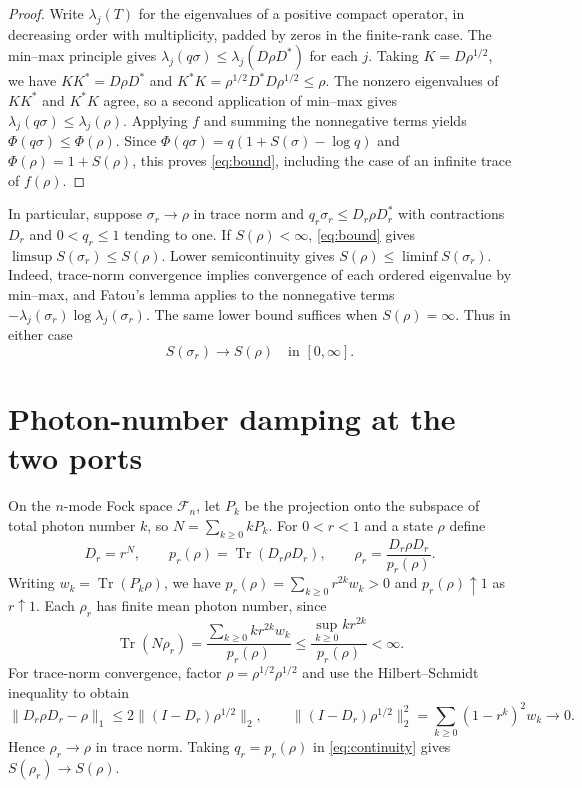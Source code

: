 \documentclass[11pt,letterpaper]{article}
\numberwithin{equation}{section}
\DeclareMathOperator{\Tr}{Tr}
\newcommand{\Fock}{\mathcal F_n}
\begin{document}
\begin{proof}
Write $\lambda_j(T)$ for the eigenvalues of a positive compact
operator, in decreasing order with multiplicity, padded by zeros in
the finite-rank case. The min--max principle gives
$\lambda_j(q\sigma)\le\lambda_j(D\rho D^*)$ for each $j$.
Taking $K=D\rho^{1/2}$, we have $KK^*=D\rho D^*$ and
$K^*K=\rho^{1/2}D^*D\rho^{1/2}\le\rho$. The nonzero eigenvalues of
$KK^*$ and $K^*K$ agree, so a second application of min--max gives
$\lambda_j(q\sigma)\le\lambda_j(\rho)$. Applying $f$ and summing the
nonnegative terms yields $\Phi(q\sigma)\le\Phi(\rho)$. Since
$\Phi(q\sigma)=q(1+S(\sigma)-\log q)$ and $\Phi(\rho)=1+S(\rho)$,
this proves \eqref{eq:bound}, including the case of an infinite trace
of $f(\rho)$.
\end{proof}

In particular, suppose $\sigma_r\to\rho$ in trace norm and
$q_r\sigma_r\le D_r\rho D_r^*$ with contractions $D_r$ and
$0<q_r\le1$ tending to one. If $S(\rho)<\infty$, \eqref{eq:bound} gives
$\limsup S(\sigma_r)\le S(\rho)$. Lower semicontinuity gives
$S(\rho)\le\liminf S(\sigma_r)$. Indeed, trace-norm convergence implies
convergence of each ordered eigenvalue by min--max, and Fatou's
lemma applies to the nonnegative terms
$-\lambda_j(\sigma_r)\log\lambda_j(\sigma_r)$. The same lower
bound suffices when $S(\rho)=\infty$. Thus in either case
\begin{equation}\label{eq:continuity}
 S(\sigma_r)\longrightarrow S(\rho)\quad\text{in }[0,\infty].
\end{equation}

\section{Photon-number damping at the two ports}

On the $n$-mode Fock space $\Fock$, let $P_k$ be the projection
onto the subspace of total photon number $k$, so
$N=\sum_{k\ge0}kP_k$. For $0<r<1$ and a state $\rho$ define
\begin{equation}\label{eq:filter}
 D_r=r^N,\qquad p_r(\rho)=\Tr(D_r\rho D_r),\qquad
 \rho_r=\frac{D_r\rho D_r}{p_r(\rho)}.
\end{equation}
Writing $w_k=\Tr(P_k\rho)$, we have
$p_r(\rho)=\sum_{k\ge0}r^{2k}w_k>0$ and $p_r(\rho)\uparrow1$ as
$r\uparrow1$. Each $\rho_r$ has finite mean photon number, since
\[
 \Tr(N\rho_r)=\frac{\sum_{k\ge0}k r^{2k}w_k}{p_r(\rho)}
 \le\frac{\sup_{k\ge0}k r^{2k}}{p_r(\rho)}<\infty.
\]
For trace-norm convergence, factor $\rho=\rho^{1/2}\rho^{1/2}$ and
use the Hilbert--Schmidt inequality to obtain
\[
 \|D_r\rho D_r-\rho\|_1\le2\|(I-D_r)\rho^{1/2}\|_2,\qquad
 \|(I-D_r)\rho^{1/2}\|_2^2=\sum_{k\ge0}(1-r^k)^2w_k\longrightarrow0.
\]
Hence $\rho_r\to\rho$ in trace norm. Taking $q_r=p_r(\rho)$ in
\eqref{eq:continuity} gives $S(\rho_r)\to S(\rho)$.
\end{document}
